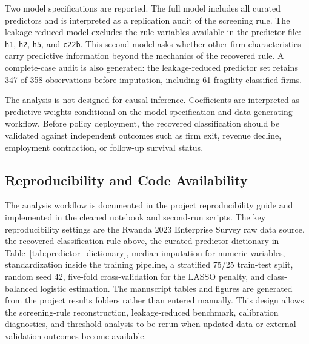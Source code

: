 Two model specifications are reported. The full model includes all curated predictors and is interpreted as a replication audit of the screening rule. The leakage-reduced model excludes the rule variables available in the predictor file: \texttt{h1}, \texttt{h2}, \texttt{h5}, and \texttt{c22b}. This second model asks whether other firm characteristics carry predictive information beyond the mechanics of the recovered rule. A complete-case audit is also generated: the leakage-reduced predictor set retains 347 of 358 observations before imputation, including 61 fragility-classified firms.

The analysis is not designed for causal inference. Coefficients are interpreted as predictive weights conditional on the model specification and data-generating workflow. Before policy deployment, the recovered classification should be validated against independent outcomes such as firm exit, revenue decline, employment contraction, or follow-up survival status.

\subsection{Reproducibility and Code Availability}

The analysis workflow is documented in the project reproducibility guide and implemented in the cleaned notebook and second-run scripts. The key reproducibility settings are the Rwanda 2023 Enterprise Survey raw data source, the recovered classification rule above, the curated predictor dictionary in Table~\ref{tab:predictor_dictionary}, median imputation for numeric variables, standardization inside the training pipeline, a stratified 75/25 train-test split, random seed 42, five-fold cross-validation for the LASSO penalty, and class-balanced logistic estimation. The manuscript tables and figures are generated from the project results folders rather than entered manually. This design allows the screening-rule reconstruction, leakage-reduced benchmark, calibration diagnostics, and threshold analysis to be rerun when updated data or external validation outcomes become available.
